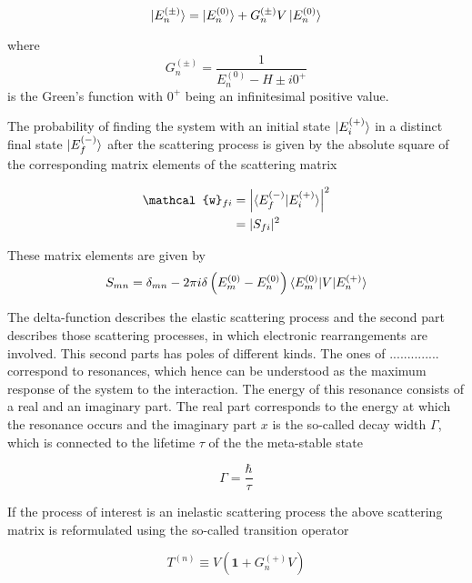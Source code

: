 \begin{equation} \label{equation:LippmannSchwinger}
 \ket{E_n^{(\pm)}} =  \ket{E_n^{(0)}} + G_n^{(\pm)}V \ket{E_n^{(0)}}
\end{equation}

where
\begin{equation}
 G_n^{(\pm)} = \frac{1}{E_n^{(0)}-H \pm i0^+}
\end{equation}
is the Green's function with $0^+$ being an infinitesimal positive value.

The probability of finding the system with an initial state $\ket{E_i^{(+)}}$
in a distinct final state $\ket{E_f^{(-)}}$ after the scattering process
is given by the absolute square of the corresponding matrix elements
of the scattering matrix

\begin{align}
 \mathcal{w}_{fi} &= \left | \braket{E_f^{(-)} | E_i^{(+)}} \right|^2\\
                  &= |S_{fi}|^2
\end{align}

These matrix elements are given by
\begin{equation}
 S_{mn} = \delta_{mn} - 2\pi i \delta \left(E_m^{(0)} - E_n^{(0)} \right)
          \braket{E_m^{(0)}| V |E_n^{(+)}}
\end{equation}

The delta-function describes the elastic scattering process and the second
part describes those scattering processes, in which electronic rearrangements
are involved. This second parts has poles of different kinds. The ones
of ..............
correspond to resonances, which hence can be understood as the maximum
response of the system to the interaction. The energy of this resonance
consists of a real and an imaginary part. The real part corresponds to the
energy at which the resonance occurs and the imaginary part $x$
is the so-called decay width $\Gamma$, which is connected to the lifetime
$\tau$ of the the meta-stable state

\begin{equation}
 \Gamma = \frac{\hbar}{\tau}
\end{equation}

If the process of interest is an inelastic scattering process the
above scattering matrix is reformulated using the so-called transition
operator

\begin{equation}
 T^{(n)} \equiv V \left( \mathbf{1} + G_n^{(+)} V \right)
\end{equation}

